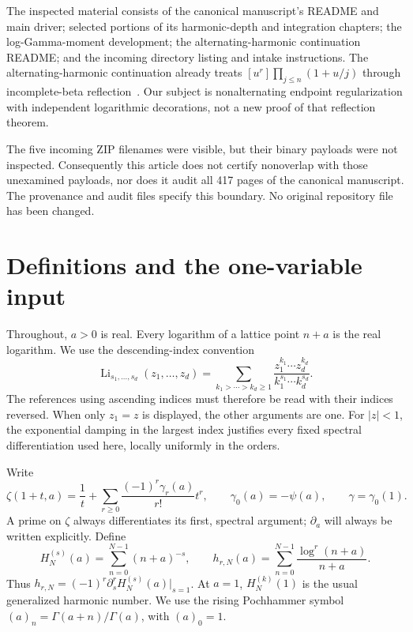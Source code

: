 \documentclass[11pt,oneside]{article}
\numberwithin{equation}{section}
\theoremstyle{definition}
\theoremstyle{remark}
\DeclareMathOperator{\Li}{Li}
\begin{document}
The inspected material consists of the canonical manuscript's README and
main driver; selected portions of its harmonic-depth and integration
chapters; the log-Gamma-moment development; the alternating-harmonic
continuation README; and the incoming directory listing and intake
instructions. The alternating-harmonic continuation already treats
$[u^r]\prod_{j\le n}(1+u/j)$ through incomplete-beta reflection~\cite{repoalt}.
Our subject is nonalternating endpoint regularization with independent
logarithmic decorations, not a new proof of that reflection theorem.

The five incoming ZIP filenames were visible, but their binary payloads were
not inspected. Consequently this article does not certify nonoverlap with
those unexamined payloads, nor does it audit all 417 pages of the canonical
manuscript. The provenance and audit files specify this boundary. No original
repository file has been changed.

\section{Definitions and the one-variable input}
\label{sec:definitions}

Throughout, $a>0$ is real. Every logarithm of a lattice point $n+a$ is the
real logarithm. We use the descending-index convention
\begin{equation}\label{eq:mpl}
\Li_{s_1,\ldots,s_d}(z_1,\ldots,z_d)
=\sum_{k_1>\cdots>k_d\ge1}
 \frac{z_1^{k_1}\cdots z_d^{k_d}}{k_1^{s_1}\cdots k_d^{s_d}}.
\end{equation}
The references using ascending indices must therefore be read with their
indices reversed. When only $z_1=z$ is displayed, the other arguments are one.
For $|z|<1$, the exponential damping in the largest index justifies every
fixed spectral differentiation used here, locally uniformly in the orders.

Write
\begin{equation}\label{eq:stieltjes}
\zeta(1+t,a)=\frac1t+
 \sum_{r\ge0}\frac{(-1)^r\gamma_r(a)}{r!}t^r,
\qquad \gamma_0(a)=-\psi(a),\qquad \gamma=\gamma_0(1).
\end{equation}
A prime on $\zeta$ always differentiates its first, spectral argument;
$\partial_a$ will always be written explicitly. Define
\begin{equation}\label{eq:harmonic}
H_N^{(s)}(a)=\sum_{n=0}^{N-1}(n+a)^{-s},\qquad
h_{r,N}(a)=\sum_{n=0}^{N-1}\frac{\log^r(n+a)}{n+a}.
\end{equation}
Thus $h_{r,N}=(-1)^r\partial_s^rH_N^{(s)}(a)|_{s=1}$.
At $a=1$, $H_N^{(k)}(1)$ is the usual generalized harmonic number.
We use the rising Pochhammer symbol $(a)_n=\Gamma(a+n)/\Gamma(a)$,
with $(a)_0=1$.
\end{document}
